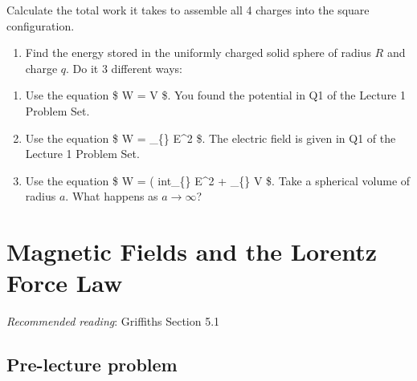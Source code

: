 \documentclass[
  letterpaper,
  DIV=11,
  numbers=noendperiod]{scrreprt}
\providecommand{\tightlist}{%
  \setlength{\itemsep}{0pt}\setlength{\parskip}{0pt}}\usepackage{longtable,booktabs,array}
\begin{document}
Calculate the total work it takes to assemble all 4 charges into the
square configuration.

\begin{enumerate}
\def\labelenumi{\arabic{enumi})}
\setcounter{enumi}{1}
\tightlist
\item
  Find the energy stored in the uniformly charged solid sphere of radius
  \(R\) and charge \(q\). Do it 3 different ways:
\end{enumerate}

\begin{enumerate}
\def\labelenumi{(\alph{enumi})}
\item
  Use the equation \$ W =  \int \rho V  \tau \$.
  You found the potential in Q1 of the Lecture 1 Problem Set.
\item
  Use the equation \$ W = 
  \int\_\{\} E\^{}2  \tau \$. The electric
  field is given in Q1 of the Lecture 1 Problem Set.
\item
  Use the equation \$ W =  \left(
  int\_\{\} E\^{}2  \tau + \oint\_\{\} V
   \cdot {}  \$. Take a
  spherical volume of radius \(a\). What happens as
  \(a \rightarrow \infty\)?
\end{enumerate}


\chapter{Magnetic Fields and the Lorentz Force
Law}\label{magnetic-fields-and-the-lorentz-force-law}

\newcommand{\l}{\mathrm{\mathbf{l}}}
\newcommand{\E}{\mathrm{\mathbf{E}}}
\newcommand{\F}{\mathrm{\mathbf{F}}}
\newcommand{\r}{\mathrm{\mathbf{r}}}
\newcommand{\B}{\mathrm{\mathbf{B}}}
\newcommand{\x}{\mathrm{\mathbf{x}}}
\newcommand{\y}{\mathrm{\mathbf{y}}}
\newcommand{\z}{\mathrm{\mathbf{z}}}
\newcommand{\v}{\mathrm{\mathbf{v}}}

\newcommand{\a}{\mathrm{\mathbf{a}}}
\newcommand{\b}{\mathrm{\mathbf{b}}}
\newcommand{\I}{\mathrm{\mathbf{I}}}
\newcommand{\l}{\mathrm{\mathbf{l}}}

\emph{Recommended reading}: Griffiths Section 5.1

\section{Pre-lecture problem}\label{pre-lecture-problem-2}
\end{document}
